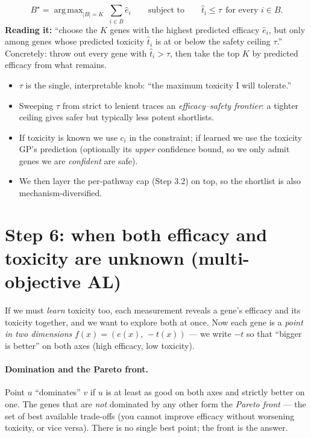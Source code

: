 \documentclass[11pt]{article}
\DeclareMathOperator*{\argmax}{arg\,max}
\begin{document}
\begin{equation}
B^\star=\argmax_{|B|=K}\ \sum_{i\in B}\hat e_i \qquad\text{subject to}\qquad \hat t_i\le\tau\ \ \text{for every } i\in B .
\label{eq:constrained}
\end{equation}
\textbf{Reading it:} ``choose the $K$ genes with the highest predicted efficacy
$\hat e_i$, but only among genes whose predicted toxicity $\hat t_i$ is at or below the
safety ceiling $\tau$.'' Concretely: throw out every gene with $\hat t_i>\tau$, then take
the top $K$ by predicted efficacy from what remains.
\begin{itemize}[leftmargin=2em,itemsep=1pt]
\item $\tau$ is the single, interpretable knob: ``the maximum toxicity I will tolerate.''
\item Sweeping $\tau$ from strict to lenient traces an \emph{efficacy--safety frontier}: a
tighter ceiling gives safer but typically less potent shortlists.
\item If toxicity is known we use $c_i$ in the constraint; if learned we use the toxicity
GP's prediction (optionally its \emph{upper} confidence bound, so we only admit genes we
are \emph{confident} are safe).
\item We then layer the per-pathway cap (Step 3.2) on top, so the shortlist is also
mechanism-diversified.
\end{itemize}

\section{Step 6: when both efficacy and toxicity are unknown (multi-objective AL)}

If we must \emph{learn} toxicity too, each measurement reveals a gene's efficacy and its
toxicity together, and we want to explore both at once. Now each gene is a \emph{point in
two dimensions} $f(x)=(e(x),\,-t(x))$ --- we write $-t$ so that ``bigger is better'' on
both axes (high efficacy, low toxicity).

\paragraph{Domination and the Pareto front.} Point $u$ ``dominates'' $v$ if $u$ is at least
as good on both axes and strictly better on one. The genes that are \emph{not} dominated by
any other form the \emph{Pareto front} --- the set of best available trade-offs (you cannot
improve efficacy without worsening toxicity, or vice versa). There is no single best point;
the front is the answer.
\end{document}

